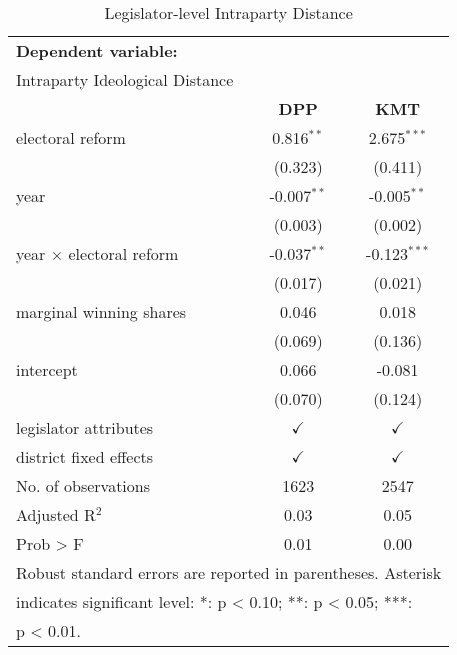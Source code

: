 \begin{table}[H]
\caption{Legislator-level Intraparty Distance\label{tab:Intra_DM}}
\centering{}%
\begin{tabular}{lcc}
\toprule 
\multicolumn{3}{l}{\textbf{Dependent variable:}}                      \tabularnewline
\multicolumn{3}{l}{Intraparty Ideological Distance}     \tabularnewline
\midrule
                             & \textbf{DPP}  & \textbf{KMT}           \tabularnewline
\midrule
electoral reform             & 0.816$^{**}$  & 2.675$^{***}$          \tabularnewline
                             & (0.323)       & (0.411)                \tabularnewline
year                         & -0.007$^{**}$ & -0.005$^{**}$          \tabularnewline
                             & (0.003)       & (0.002)                \tabularnewline
year $\times$ electoral reform  & -0.037$^{**}$     & -0.123$^{***}$  \tabularnewline
                                & (0.017)           & (0.021)         \tabularnewline
marginal winning shares         & 0.046             & 0.018           \tabularnewline
                                & (0.069)           & (0.136)         \tabularnewline
intercept                       & 0.066             & -0.081          \tabularnewline
                                & (0.070)           & (0.124)         \tabularnewline
legislator attributes           & $\checkmark$      & $\checkmark$    \tabularnewline
district fixed effects          & $\checkmark$      & $\checkmark$    \tabularnewline
\midrule
No. of observations             & 1623              & 2547            \tabularnewline
Adjusted R$^{2}$                & 0.03              & 0.05            \tabularnewline
Prob > F                        & 0.01              & 0.00            \tabularnewline
\midrule

\multicolumn{3}{l}{\footnotesize{}Robust standard errors are reported in parentheses. Asterisk }           \tabularnewline
\multicolumn{3}{l}{\footnotesize{}indicates significant level: {*}: p < 0.10; {*}{*}: p < 0.05; {*}{*}{*}:}\tabularnewline
\multicolumn{3}{l}{\footnotesize{}p < 0.01.}                                                               \tabularnewline
\end{tabular}
\end{table}